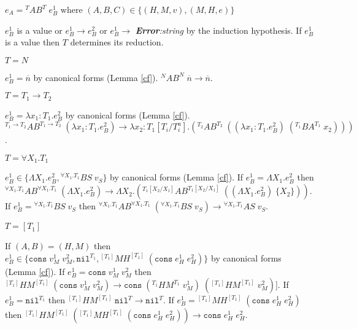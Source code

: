 \begin{case}
\label{ab}
$e_{A}={^{T}A}B^{T}\;e_{B}^{1}$ where $(A,B,C)\in\lbrace(H,M,v),(M,H,e)\rbrace$

$e_{B}^{1}$ is a value or $e_{B}^{1}\rightarrow e_{B}^{2}$ or $e_{B}^{1}\rightarrow$ \emph{\textbf{Error}:\;string} by the induction hypothesis.  If $e_{B}^{1}$ is a value then $T$ determines its reduction.
\begin{subcase}
$T=N$

$e_{B}^{1}=\overline{n}$ by canonical forms (Lemma \ref{cf}).  $^{N}AB^{N}\;\overline{n}\rightarrow\overline{n}$.
\end{subcase}
\begin{subcase}
$T=T_{1}\rightarrow T_{2}$

$e_{B}^{1}=\lambda x_{1}:T_{1}.e_{B}^{2}$ by canonical forms (Lemma \ref{cf}).  $^{T_{1}\rightarrow T_{2}}AB^{T_{1}\rightarrow T_{2}}\;(\lambda x_{1}:T_{1}.e_{B}^{2})\rightarrow\lambda x_{2}:T_{1}[T_{i}/T^{a}_{i}].(^{T_{2}}AB^{T_{2}}\;((\lambda x_{1}:T_{1}.e_{B}^{2})\;(^{T_{1}}BA^{T_{1}}\;x_{2})))$.
\end{subcase}
\begin{subcase}
$T=\forall X_{1}.T_{1}$

$e_{B}^{1}\in\lbrace\Lambda X_{1}.e_{B}^{2},{^{\forall X_{1}.T_{1}}B}S\;v_{S}\rbrace$ by canonical forms (Lemma \ref{cf}).  If $e_{B}^{1}=\Lambda X_{1}.e_{B}^{2}$ then $^{\forall X_{1}.T_{1}}AB^{\forall X_{1}.T_{1}}\;(\Lambda X_{1}.e_{B}^{2})\rightarrow\Lambda X_{2}.(^{T_{1}[X_{2}/X_{1}]}AB^{T_{1}[X_{2}/X_{1}]}\;((\Lambda X_{1}.e_{B}^{2})\;\lbrace X_{2}\rbrace))$.  If $e_{B}^{1}={^{\forall X_{1}.T_{1}}B}S\;v_{S}$ then $^{\forall X_{1}.T_{1}}AB^{\forall X_{1}.T_{1}}\;(^{\forall X_{1}.T_{1}}BS\;v_{S})\rightarrow{^{\forall X_{1}.T_{1}}A}S\;v_{S}$.
\end{subcase}
\begin{subcase}
$T=[T_{1}]$

If $(A,B)=(H,M)$ then $e_{B}^{1}\in\lbrace\mathtt{cons}\;v_{M}^{1}\;v_{M}^{2},\mathtt{nil}^{T_{1}},{^{[T_{1}]}M}H^{[T_{1}]}\;(\mathtt{cons}\;e_{H}^{1}\;e_{H}^{2})\rbrace$ by canonical forms (Lemma \ref{cf}).  If $e_{B}^{1}=\mathtt{cons}\;v_{M}^{1}\;v_{M}^{2}$ then $^{[T_{1}]}HM^{[T_{1}]}\;(\mathtt{cons}\;v_{M}^{1}\;v_{M}^{2})\rightarrow\mathtt{cons}\;(^{T_{1}}HM^{T_{1}}\;v_{M}^{1})\;(^{[T_{1}]}HM^{[T_{1}]}\;v_{M}^{2})]$.  If $e_{B}^{1}=\mathtt{nil}^{T_{1}}$ then $^{[T_{1}]}HM^{[T_{1}]}\;\mathtt{nil}^{T}\rightarrow\mathtt{nil}^{T}$.  If $e_{B}^{1}={^{[T_{1}]}M}H^{[T_{1}]}\;(\mathtt{cons}\;e_{H}^{1}\;e_{H}^{2})$ then $^{[T_{1}]}HM^{[T_{1}]}\;(^{[T_{1}]}MH^{[T_{1}]}\;(\mathtt{cons}\;e_{H}^{1}\;e_{H}^{2}))\rightarrow\mathtt{cons}\;e_{H}^{1}\;e_{H}^{2}$.


\end{subcase}
\end{case}
